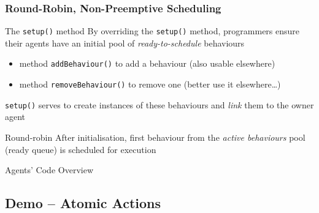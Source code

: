 \documentclass{beamer}\mode<presentation>{\usetheme{AMSCesenaPurpleAndGold}}
\begin{document}
\begin{frame}[c,allowframebreaks]\frametitle{Round-Robin, Non-Preemptive Scheduling}
    \begin{block}{The \texttt{setup()} method}
        By overriding the \texttt{setup()} method, \jade{} programmers ensure their agents have an initial pool of \emph{ready-to-schedule} behaviours
        \begin{itemize}
            \item method \texttt{addBehaviour()} to add a behaviour (also usable elsewhere)
            \item method \texttt{removeBehaviour()} to remove one (better use it elsewhere\ldots)
        \end{itemize}
        \texttt{setup()} serves to create instances of these behaviours and \emph{link} them to the owner agent
    \end{block}
    \begin{block}{Round-robin}
        After initialisation, first behaviour from the \emph{active behaviours} pool (\alert{ready queue}) is scheduled for execution
    \end{block}
\end{frame}

\begin{frame}{Agents' Code Overview}
    
\end{frame}

\startDemo

\subsection{Demo \currentDemo{} -- Atomic Actions}
\end{document}
